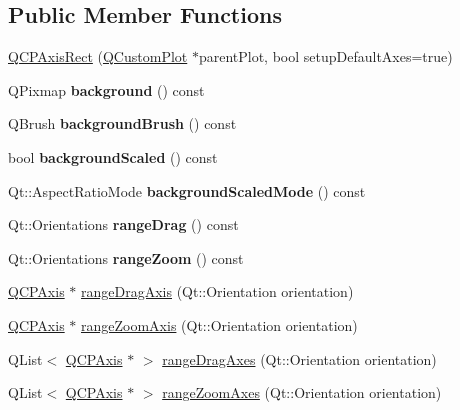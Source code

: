 \subsection*{Public Member Functions}
\begin{DoxyCompactItemize}
\item 
\hyperlink{classQCPAxisRect_a60b31dece805462c1b82eea2e69ba042}{Q\+C\+P\+Axis\+Rect} (\hyperlink{classQCustomPlot}{Q\+Custom\+Plot} $\ast$parent\+Plot, bool setup\+Default\+Axes=true)
\item 
\mbox{\label{classQCPAxisRect_a572deec9c9a4d5987d5c5f78521991e6}} 
Q\+Pixmap {\bfseries background} () const
\item 
\mbox{\label{classQCPAxisRect_a7d09540e3fef12362d00e6bac92b6453}} 
Q\+Brush {\bfseries background\+Brush} () const
\item 
\mbox{\label{classQCPAxisRect_a059ede9a5fdcafb5cef280cd65fe4f3a}} 
bool {\bfseries background\+Scaled} () const
\item 
\mbox{\label{classQCPAxisRect_a06b98faf54b5491bff780294e423d3ff}} 
Qt\+::\+Aspect\+Ratio\+Mode {\bfseries background\+Scaled\+Mode} () const
\item 
\mbox{\label{classQCPAxisRect_aa3a84c768ad6edd08fd4c5dec176828f}} 
Qt\+::\+Orientations {\bfseries range\+Drag} () const
\item 
\mbox{\label{classQCPAxisRect_aa0d8414ef040523f8b2d55f0c0bddbee}} 
Qt\+::\+Orientations {\bfseries range\+Zoom} () const
\item 
\hyperlink{classQCPAxis}{Q\+C\+P\+Axis} $\ast$ \hyperlink{classQCPAxisRect_a6d7c22cfc54fac7a3d6ef80b133a8574}{range\+Drag\+Axis} (Qt\+::\+Orientation orientation)
\item 
\hyperlink{classQCPAxis}{Q\+C\+P\+Axis} $\ast$ \hyperlink{classQCPAxisRect_a679c63f2b8daccfe6ec5110dce3dd3b6}{range\+Zoom\+Axis} (Qt\+::\+Orientation orientation)
\item 
Q\+List$<$ \hyperlink{classQCPAxis}{Q\+C\+P\+Axis} $\ast$ $>$ \hyperlink{classQCPAxisRect_aae5f99a044ca911685a306f01b7ff941}{range\+Drag\+Axes} (Qt\+::\+Orientation orientation)
\item 
Q\+List$<$ \hyperlink{classQCPAxis}{Q\+C\+P\+Axis} $\ast$ $>$ \hyperlink{classQCPAxisRect_a86aac0f435f209d60dacd22cda10c104}{range\+Zoom\+Axes} (Qt\+::\+Orientation orientation)

\end{DoxyCompactItemize}
